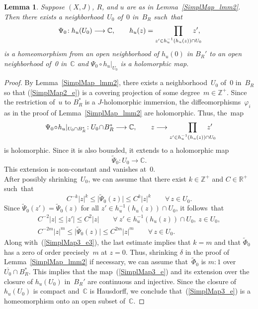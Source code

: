 \documentclass[11pt]{article}
\numberwithin{equation}{section}
\newtheorem{lmm}[thm]{Lemma}
\theoremstyle{definition}
\def\BE#1{\begin{equation}\label{#1}}
\def\EE{\end{equation}}
\def\eref#1{(\ref{#1})}
\def\ov#1{\overline{#1}}
\def\wt#1{\widetilde{#1}}
\def\lra{\longrightarrow}
\def\C{\mathbb{C}}
\def\R{\mathbb R}
\def\Z{{\mathbb Z}}
\def\de{\delta}
\def\vph{\varphi}
\begin{document}
\begin{lmm}\label{SimplMap_lmm3}
Suppose $(X,J)$, $R$, and $u$ are as in Lemma~\ref{SimplMap_lmm2}.
Then there exists a neighborhood~$U_0$ of~$0$ in~$B_R$ such~that 
\BE{SimplMap3_e}\Psi_0\!: h_u(U_0)\lra\C, \qquad
h_u(z)=\prod_{z'\in h_u^{-1}(h_u(z))\cap U_0}\hspace{-.2in}z',\EE 
is a homeomorphism from an open neighborhood of $h_u(0)$ in $B_R'$
to an open neighborhood of~0 in~$\C$ and $\Psi_0\!\circ\!h_u|_{U_0}$ is a holomorphic map.
\end{lmm}

\begin{proof}
By Lemma~\ref{SimplMap_lmm2}, there exists a neighborhood~$U_0$ of~$0$ in~$B_R$
so that  \eref{SimplMap2_e} is a covering projection of some degree~$m\!\in\!\Z^+$.
Since the restriction of~$u$ to $B_R^*$ is a $J$-holomorphic immersion,
the diffeomorphisms~$\vph_i$ as in the proof of Lemma~\ref{SimplMap_lmm2}
are holomorphic.
Thus, the~map
$$\Psi_0\!\circ\!h_u|_{U_0\cap B_R^*}\!:U_0\!\cap\!B_R^*\lra\C, \qquad
z\lra\prod_{z'\in h_u^{-1}(h_u(z))\cap U_0}\hspace{-.2in}z'$$
is holomorphic.
Since it is also bounded, it extends to a holomorphic map
$$\wt\Psi_0\!: U_0\lra\C.$$
This extension is non-constant and vanishes at~0.\\

\noindent
After possibly shrinking~$U_0$, we can assume that there exist $k\!\in\!\Z^+$
and $C\!\in\!\R^+$ such~that 
\BE{SimplMap3_e3}  C^{-k}|z|^k\le \big|\wt\Psi_0(z)\big|\le C^k|z|^k
\qquad\forall\,z\!\in\!U_0.\EE
Since $\wt\Psi_0(z')\!=\!\wt\Psi_0(z)$ for all $z'\!\in\!h_u^{-1}(h_u(z))\!\cap\!U_0$,
it follows~that 
\begin{gather*}
C^{-2}|z|\le |z'|\le C^2|z|
\qquad\forall~z'\!\in\!h_u^{-1}(h_u(z))\!\cap\!U_0,~z\!\in\!U_0,\\
C^{-2m}|z|^m\le \big|\wt\Psi_0(z)\big|\le C^{2m}|z|^m
\qquad\forall\,z\!\in\!U_0.
\end{gather*}
Along with~\eref{SimplMap3_e3}, the last estimate implies that $k\!=\!m$
and that $\wt\Phi_0$ has a zero of order precisely~$m$ at $z\!=\!0$.
Thus, shrinking $\de$ in the proof of Lemma~\ref{SimplMap_lmm2} if necessary,
we can assume that~$\wt\Phi_0$ is $m\!:\!1$ over $\ov{U_0}\!\cap\!B_R^*$.
This implies that the map~\eref{SimplMap3_e} and its extension over the closure
of $h_u(U_0)$ in~$B_R'$ are continuous and injective.
Since the closure of $h_u(U_0)$ is compact and~$\C$ is Hausdorff,
we conclude that~\eref{SimplMap3_e} is a homeomorphism onto an open subset 
of~$\C$.
\end{proof}
\end{document}
